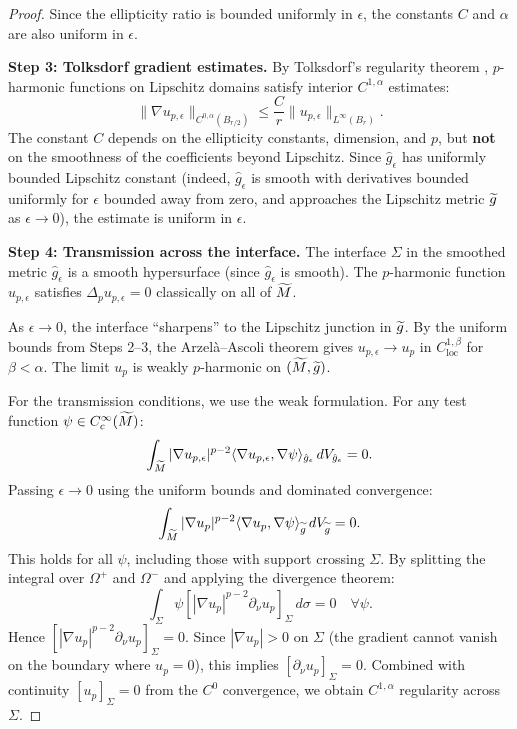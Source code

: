\begin{proof}
Since the ellipticity ratio is bounded uniformly in $\epsilon$, the constants $C$ and $\alpha$ are also uniform in $\epsilon$.

\textbf{Step 3: Tolksdorf gradient estimates.}
By Tolksdorf's regularity theorem \cite{tolksdorf1984}, $p$-harmonic functions on Lipschitz domains satisfy interior $C^{1,\alpha}$ estimates:
\begin{equation}
    \|\nabla u_{p,\epsilon}\|_{C^{0,\alpha}(B_{r/2})} \le \frac{C}{r} \|u_{p,\epsilon}\|_{L^\infty(B_r)}.
\end{equation}
The constant $C$ depends on the ellipticity constants, dimension, and $p$, but \textbf{not} on the smoothness of the coefficients beyond Lipschitz. Since $\hat{g}_\epsilon$ has uniformly bounded Lipschitz constant (indeed, $\hat{g}_\epsilon$ is smooth with derivatives bounded uniformly for $\epsilon$ bounded away from zero, and approaches the Lipschitz metric $\widetilde{g}$ as $\epsilon \to 0$), the estimate is uniform in $\epsilon$.

\textbf{Step 4: Transmission across the interface.}
The interface $\Sigma$ in the smoothed metric $\hat{g}_\epsilon$ is a smooth hypersurface (since $\hat{g}_\epsilon$ is smooth). The $p$-harmonic function $u_{p,\epsilon}$ satisfies $\Delta_p u_{p,\epsilon} = 0$ classically on all of $\widetilde{M}$.

As $\epsilon \to 0$, the interface ``sharpens'' to the Lipschitz junction in $\widetilde{g}$. By the uniform bounds from Steps 2--3, the Arzel\`a--Ascoli theorem gives $u_{p,\epsilon} \to u_p$ in $C^{1,\beta}_{\mathrm{loc}}$ for $\beta < \alpha$. The limit $u_p$ is weakly $p$-harmonic on $(\widetilde{M}, \widetilde{g})$.

For the transmission conditions, we use the weak formulation. For any test function $\psi \in C^\infty_c(\widetilde{M})$:
\begin{equation}
    \int_{\widetilde{M}} |\nabla u_{p,\epsilon}|^{p-2} \langle \nabla u_{p,\epsilon}, \nabla \psi \rangle_{\hat{g}_\epsilon} \, dV_{\hat{g}_\epsilon} = 0.
\end{equation}
Passing $\epsilon \to 0$ using the uniform bounds and dominated convergence:
\begin{equation}
    \int_{\widetilde{M}} |\nabla u_p|^{p-2} \langle \nabla u_p, \nabla \psi \rangle_{\widetilde{g}} \, dV_{\widetilde{g}} = 0.
\end{equation}
This holds for all $\psi$, including those with support crossing $\Sigma$. By splitting the integral over $\Omega^+$ and $\Omega^-$ and applying the divergence theorem:
\begin{equation}
    \int_\Sigma \psi \left[ |\nabla u_p|^{p-2} \partial_\nu u_p \right]_\Sigma \, d\sigma = 0 \quad \forall \psi.
\end{equation}
Hence $\left[ |\nabla u_p|^{p-2} \partial_\nu u_p \right]_\Sigma = 0$. Since $|\nabla u_p| > 0$ on $\Sigma$ (the gradient cannot vanish on the boundary where $u_p = 0$), this implies $[\partial_\nu u_p]_\Sigma = 0$. Combined with continuity $[u_p]_\Sigma = 0$ from the $C^0$ convergence, we obtain $C^{1,\alpha}$ regularity across $\Sigma$.
\end{proof}

